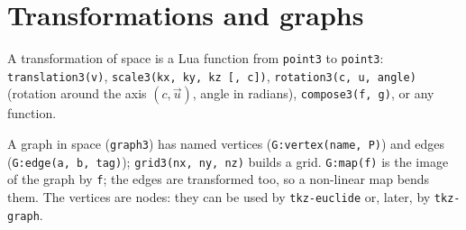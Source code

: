 \documentclass[11pt]{article}
\newcommand\code[1]{\texttt{#1}}
\newenvironment{example}[1]
  {\def\exfile{#1.tex}\VerbatimOut{\exfile}}
  {\endVerbatimOut
   \VerbatimInput[fontsize=\small, frame=single]{\exfile}
   \begin{center}\end{center}}
\begin{document}
\section{Transformations and graphs}

A transformation of space is a Lua function from \code{point3} to
\code{point3}: \code{translation3(v)}, \code{scale3(kx, ky, kz [, c])},
\code{rotation3(c, u, angle)} (rotation around the axis $(c, \vec u)$, angle
in radians), \code{compose3(f, g)}, or any function.

A graph in space (\code{graph3}) has named vertices
(\code{G:vertex(name, P)}) and edges (\code{G:edge(a, b, tag)});
\code{grid3(nx, ny, nz)} builds a grid. \code{G:map(f)} is the image of the
graph by \code{f}; the edges are transformed too, so a non-linear map bends
them. The vertices are nodes: they can be used by \code{tkz-euclide} or, later,
by \code{tkz-graph}.

\end{document}
